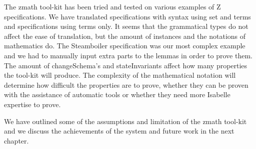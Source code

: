 The \gls{zmath} tool-kit has been tried and tested on various examples of Z
specifications. We have translated specifications with syntax using set and
terms and specifications using terms only. It seems that the grammatical types
do not affect the ease of translation, but the amount of instances and the
notations of mathematics do. The Steamboiler specification was our most complex
example and we had to manually input extra parts to the lemmas in order to prove
them. The amount of changeSchema's and stateInvariants affect how many
properties the tool-kit will produce. The complexity of the mathematical notation
will determine how difficult the properties are to prove, whether they can be
proven with the assistance of automatic tools or whether they need more Isabelle
expertise to prove. 

We have outlined some of the assumptions and limitation of the \gls{zmath}
tool-kit and we discuss the achievements of the system and future work in the next
chapter.